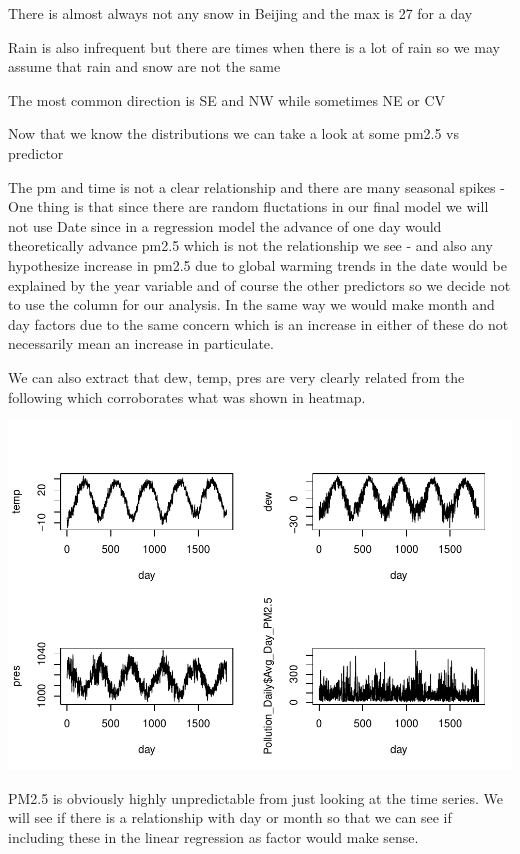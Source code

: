 \documentclass[
]{article}
\begin{document}
There is almost always not any snow in Beijing and the max is 27 for a
day

Rain is also infrequent but there are times when there is a lot of rain
so we may assume that rain and snow are not the same

The most common direction is SE and NW while sometimes NE or CV

Now that we know the distributions we can take a look at some pm2.5 vs
predictor

The pm and time is not a clear relationship and there are many seasonal
spikes - One thing is that since there are random fluctations in our
final model we will not use Date since in a regression model the advance
of one day would theoretically advance pm2.5 which is not the
relationship we see - and also any hypothesize increase in pm2.5 due to
global warming trends in the date would be explained by the year
variable and of course the other predictors so we decide not to use the
column for our analysis. In the same way we would make month and day
factors due to the same concern which is an increase in either of these
do not necessarily mean an increase in particulate.

We can also extract that dew, temp, pres are very clearly related from
the following which corroborates what was shown in heatmap.

\includegraphics[height=0.9\textheight]{Final_Project_2_files/figure-latex/unnamed-chunk-5-1}

PM2.5 is obviously highly unpredictable from just looking at the time
series. We will see if there is a relationship with day or month so that
we can see if including these in the linear regression as factor would
make sense.
\end{document}
